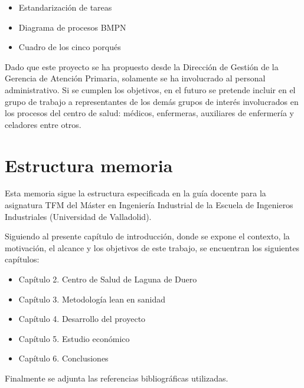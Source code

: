 \begin{itemize}
    \item Estandarización de tareas
    \item Diagrama de procesos BMPN
    \item Cuadro de los cinco porqués
\end{itemize}

Dado que este proyecto se ha propuesto desde la Dirección de Gestión de la Gerencia de Atención Primaria, solamente se ha involucrado al personal administrativo. Si se cumplen los objetivos, en el futuro se pretende incluir en el grupo de trabajo a representantes de los demás grupos de interés involucrados en los procesos del centro de salud: médicos, enfermeras, auxiliares de enfermería y celadores entre otros.

\section{Estructura memoria}

Esta memoria sigue la estructura especificada en la guía docente para la asignatura TFM del Máster en Ingeniería Industrial de la Escuela de Ingenieros Industriales (Universidad de Valladolid).

Siguiendo al presente capítulo de introducción, donde se expone el contexto, la motivación, el alcance y los objetivos de este trabajo, se encuentran los siguientes capítulos:

\begin{itemize}
    \item Capítulo 2. Centro de Salud de Laguna de Duero
    \item Capítulo 3. Metodología lean en sanidad
    \item Capítulo 4. Desarrollo del proyecto
    \item Capítulo 5. Estudio económico
    \item Capítulo 6. Conclusiones
\end{itemize}

Finalmente se adjunta las referencias bibliográficas utilizadas.
